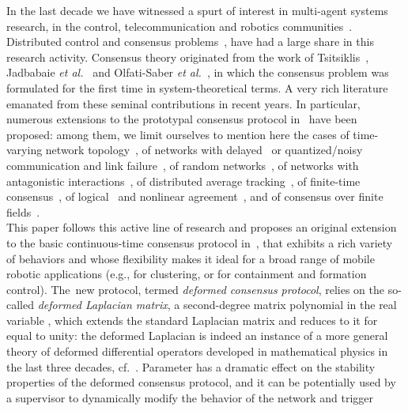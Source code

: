 \documentclass[letterpaper,9pt,twocolumn]{autart}
\begin{document}
In the last decade we have witnessed a spurt of interest in multi-agent systems research, in the
control, telecommunication and robotics communities~\cite{BulloCoMa_book09,MesbahiEg_book10,Zampieri_IFAC08,Springer_Handbook08_ch41}.
Distributed control and consensus problems~\cite{OlfatiFaMu_IEEE07,RenBeAt_CSM07}, 
have had a large share in this research activity. Consensus theory originated from the work
of Tsitsiklis~\cite{Tsitsiklis_PhD84}, Jadbabaie \emph{et al.}~\cite{JadbabaieJiMo_TAC03}
and Olfati-Saber \emph{et al.}~\cite{OlfatiSaberMu_TAC04}, in which the consensus problem
was formulated for the first time in system-theoretical terms.
A very rich literature emanated from these seminal contributions in recent years. In particular,
numerous extensions to the prototypal consensus protocol in~\cite{OlfatiSaberMu_TAC04}
have been proposed: among them, we limit
ourselves to mention here the cases of time-varying network topology~\cite{Moreau_TAC05,RenBe_TAC05},
of networks with delayed~\cite{OlfatiSaberMu_TAC04} or quantized\big/noisy communication and link
failure~\cite{FrascaCaFaZa_IJRNC09,KarMo_TSP09}, of random networks~\cite{PorfiriSt_TAC07,TahbazJa_TAC08,FagnaniZa_JSAC08},
of networks with antagonistic interactions~\cite{Altafini_PLOSONE12,Altafini_TAC13},
of distributed average tracking~\cite{SpanosOlMu_IFAC05,YangFrLy_TAC08,ChenCaRe_TAC12}, 
of finite-time consensus~\cite{WangXi_TAC10,Kibangou_ACC12}, of logical~\cite{FagioliniViBi_CDC08} and nonlinear
agreement~\cite{BausoGiPe_SCL06,Cortes_AUTO08}, 
and of consensus over finite fields~\cite{PasqualettiBoBu_AUTO13}.\\
This paper follows this active line of research and proposes an original extension to the basic continuous-time consensus protocol in~\cite{OlfatiSaberMu_TAC04},
that exhibits a rich variety of behaviors and whose flexibility makes it ideal for a broad range of mobile
robotic \mbox{applications} (e.g., for clustering, or for containment and formation control).
The~new protocol, termed \emph{deformed consensus protocol}, relies on the
so-called \emph{deformed Laplacian matrix}, a second-degree matrix polynomial in the real variable ,
which extends the standard Laplacian matrix and reduces to it for  equal to unity: the deformed Laplacian is indeed
an instance of a more general theory of deformed differential operators developed in mathematical physics in
the last three decades, cf.~\cite[Ch. 18]{HislopSi_book96}. Parameter  has a dramatic
effect on the stability properties of the deformed consensus protocol, and it can be potentially used
by a supervisor to dynamically modify the \mbox{behavior} of the network and trigger
\end{document}
